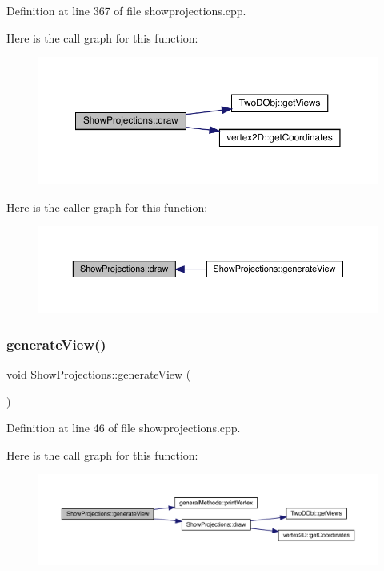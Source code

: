 Definition at line 367 of file showprojections.\+cpp.

Here is the call graph for this function\+:
\nopagebreak
\begin{figure}[H]
\begin{center}
\leavevmode
\includegraphics[width=350pt]{class_show_projections_aaaf367e35dded9fbb5971b5e5a134373_cgraph}
\end{center}
\end{figure}
Here is the caller graph for this function\+:
\nopagebreak
\begin{figure}[H]
\begin{center}
\leavevmode
\includegraphics[width=350pt]{class_show_projections_aaaf367e35dded9fbb5971b5e5a134373_icgraph}
\end{center}
\end{figure}
\mbox{\label{class_show_projections_aafb940c0c1400571770261580285137c}} 
\subsubsection{\texorpdfstring{generate\+View()}{generateView()}}
{\footnotesize\ttfamily void Show\+Projections\+::generate\+View (\begin{DoxyParamCaption}{ }\end{DoxyParamCaption})}



Definition at line 46 of file showprojections.\+cpp.

Here is the call graph for this function\+:
\nopagebreak
\begin{figure}[H]
\begin{center}
\leavevmode
\includegraphics[width=350pt]{class_show_projections_aafb940c0c1400571770261580285137c_cgraph}
\end{center}
\end{figure}


